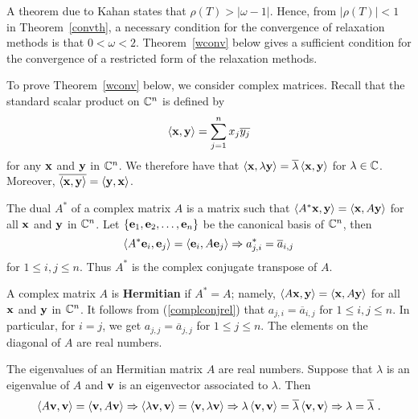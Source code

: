 A theorem due to Kahan states that $\rho(T) > |\omega -1|$.
Hence, from $|\rho(T)| < 1$ in Theorem~\ref{convth}, a necessary
condition for the convergence of relaxation methods is that
$0 < \omega < 2$.  Theorem~\ref{wconv} below gives a sufficient condition
for the convergence of a restricted form of the relaxation methods.

To prove Theorem~\ref{wconv} below, we consider complex matrices.
Recall that the standard scalar product on $\mathbb{C}^n$ is defined by
\[
\left\langle{\mathbf{x}} , {\mathbf{y}}\right\rangle = \sum_{j=1}^n x_j \overline{y_j}
\]
for any $\mathbf{x}$ and $\mathbf{y}$ in $\mathbb{C}^n$.  We therefore have that
$\left\langle{\mathbf{x}} , {\lambda \mathbf{y}}\right\rangle = \overline{\lambda} \left\langle{\mathbf{x}} , {\mathbf{y}}\right\rangle$ 
for $\lambda\in \mathbb{C}$.  Moreover,
$\overline{\left\langle{\mathbf{x}} , {\mathbf{y}}\right\rangle} = \left\langle{\mathbf{y}} , {\mathbf{x}}\right\rangle$.

The dual $A^\ast$ of a \nn complex matrix $A$ is a \nn matrix such that
$\left\langle{A^\ast\mathbf{x}} , {\mathbf{y}}\right\rangle = \left\langle{\mathbf{x}} , {A\mathbf{y}}\right\rangle$ for all $\mathbf{x}$ and
$\mathbf{y}$ in $\mathbb{C}^n$.
Let $\{\mathbf{e}_1, \mathbf{e}_2, \ldots, \mathbf{e}_n\}$ be the canonical basis
of $\mathbb{C}^n$, then
\begin{equation}\label{complconjrel}
\left\langle{A^\ast\mathbf{e}_i} , {\mathbf{e}_j}\right\rangle = \left\langle{\mathbf{e}_i} , {A\mathbf{e}_j}\right\rangle
\Rightarrow  a^\ast_{j,i} = \overline{a}_{i,j}
\end{equation}
for $1\leq i,j \leq n$.  Thus $A^\ast$ is the complex conjugate
transpose of $A$.

A \nn complex matrix $A$ is
{\bfseries Hermitian} if $A^\ast = A$; namely,
$\left\langle{A\mathbf{x}} , {\mathbf{y}}\right\rangle = \left\langle{\mathbf{x}} , {A\mathbf{y}}\right\rangle$ for all $\mathbf{x}$ and
$\mathbf{y}$ in $\mathbb{C}^n$.  It follows from (\ref{complconjrel}) that
$a_{j,i} = \overline{a}_{i,j}$ for $1\leq i,j \leq n$.  In particular, 
for $i=j$, we get $a_{j,j} = \overline{a}_{j,j}$ for $1\leq j \leq n$.
The elements on the diagonal of $A$ are real numbers.

The eigenvalues of an Hermitian matrix $A$ are real numbers.  Suppose that
$\lambda$ is an eigenvalue of $A$ and $\mathbf{v}$ is an eigenvector
associated to $\lambda$.  Then
\begin{equation}\label{complconjrelEigen}
\left\langle{A\mathbf{v}} , {\mathbf{v}}\right\rangle = \left\langle{\mathbf{v}} , {A\mathbf{v}}\right\rangle
\Rightarrow \left\langle{\lambda\mathbf{v}} , {\mathbf{v}}\right\rangle = \left\langle{\mathbf{v}} , {\lambda\mathbf{v}}\right\rangle
\Rightarrow \lambda \left\langle{\mathbf{v}} , {\mathbf{v}}\right\rangle
= \overline{\lambda} \left\langle{\mathbf{v}} , {\mathbf{v}}\right\rangle
\Rightarrow  \lambda = \overline{\lambda} \ .
\end{equation}


